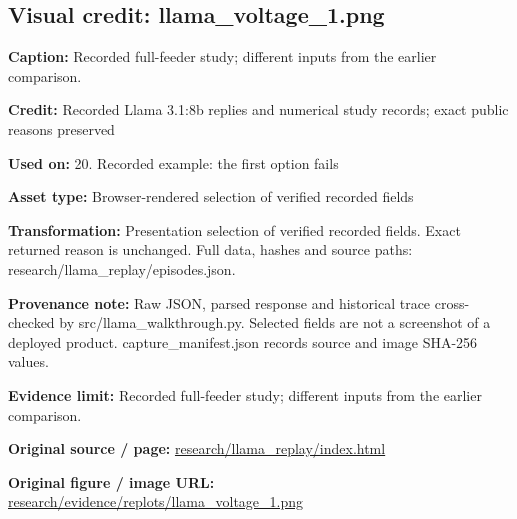 \documentclass[10pt,letterpaper]{article}
\begin{document}
\subsection*{Visual credit: llama\_voltage\_1.png}
\textbf{Caption:} Recorded full-feeder study; different inputs from the earlier comparison.\par
\textbf{Credit:} Recorded Llama 3.1:8b replies and numerical study records; exact public reasons preserved\par
\textbf{Used on:} 20. Recorded example: the first option fails\par
\textbf{Asset type:} Browser-rendered selection of verified recorded fields\par
\textbf{Transformation:} Presentation selection of verified recorded fields. Exact returned reason is unchanged. Full data, hashes and source paths: research/llama\_replay/episodes.json.\par
\textbf{Provenance note:} Raw JSON, parsed response and historical trace cross-checked by src/llama\_walkthrough.py. Selected fields are not a screenshot of a deployed product. capture\_manifest.json records source and image SHA-256 values.\par
\textbf{Evidence limit:} Recorded full-feeder study; different inputs from the earlier comparison.\par
\textbf{Original source / page:} \href{../research/llama_replay/index.html}{\small\ttfamily research/\allowbreak{}llama\_\allowbreak{}replay/\allowbreak{}index.\allowbreak{}html}\par
\textbf{Original figure / image URL:} \href{../research/evidence/replots/llama_voltage_1.png}{\small\ttfamily research/\allowbreak{}evidence/\allowbreak{}replots/\allowbreak{}llama\_\allowbreak{}voltage\_\allowbreak{}1.\allowbreak{}png}\par
\par\medskip
\end{document}
